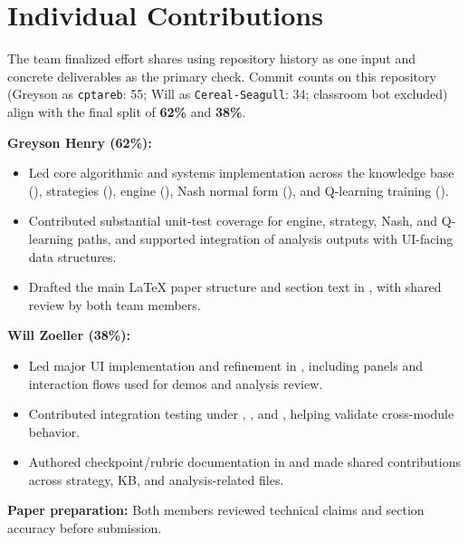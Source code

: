 \section{Individual Contributions}

The team finalized effort shares using repository history as one input and concrete deliverables as the primary check. Commit counts on this repository (Greyson as \texttt{cptareb}: 55; Will as \texttt{Cereal-Seagull}: 34; classroom bot excluded) align with the final split of \textbf{62\%} and \textbf{38\%}.

\textbf{Greyson Henry (62\%):}
\begin{itemize}
  \item Led core algorithmic and systems implementation across the knowledge base (), strategies (), engine (), Nash normal form (), and Q-learning training ().
  \item Contributed substantial unit-test coverage for engine, strategy, Nash, and Q-learning paths, and supported integration of analysis outputs with UI-facing data structures.
  \item Drafted the main LaTeX paper structure and section text in , with shared review by both team members.
\end{itemize}

\textbf{Will Zoeller (38\%):}
\begin{itemize}
  \item Led major UI implementation and refinement in , including panels and interaction flows used for demos and analysis review.
  \item Contributed integration testing under , , and , helping validate cross-module behavior.
  \item Authored checkpoint/rubric documentation in  and made shared contributions across strategy, KB, and analysis-related files.
\end{itemize}

\textbf{Paper preparation:} Both members reviewed technical claims and section accuracy before submission.
